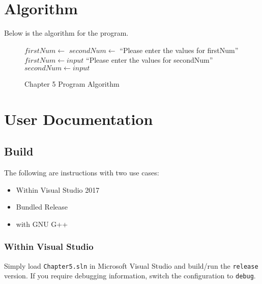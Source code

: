 \documentclass[a4paper]{article}
\begin{document}
  \newpage
  \section{Algorithm}
    Below is the algorithm for the program.
    \begin{figure}[h]
      \caption{Chapter 5 Program Algorithm}
      \vspace{12pt}
      \begin{algorithmic}
        \State {}
        \State 
        \State $firstNum\gets $
        \State $secondNum\gets $
        \State {}
        \State {} ``Please enter the values for firstNum''
          \State $firstNum\gets input$
        \State {} ``Please enter the values for secondNum''
          \State $secondNum\gets input$
      \end{algorithmic}
      \label{alg:c5}
    \end{figure}


  \newpage
  \section{User Documentation}

    \subsection{Build}
      The following are instructions with two use cases:
      \begin{itemize}
        \item Within Visual Studio 2017
        \item Bundled Release
        \item with GNU G++
      \end{itemize}
      \subsubsection{Within Visual Studio}
        Simply load \texttt{Chapter5.sln} in Microsoft Visual Studio and 
          build/run the \texttt{release} version. If you require debugging
          information, switch the configuration to \texttt{debug}.
\end{document}
